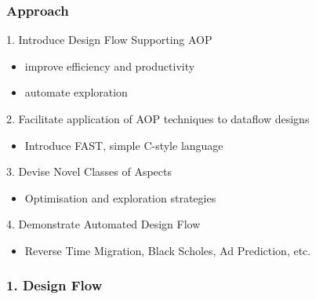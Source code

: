 \begin{frame}
  \frametitle{Approach}
  \begin{beamerboxesrounded}{1. Introduce Design Flow Supporting AOP}
    \begin{itemize}
      \item improve efficiency and productivity
      \item automate exploration
    \end{itemize}
  \end{beamerboxesrounded}
  \begin{beamerboxesrounded}{2. Facilitate application of AOP
      techniques to dataflow designs}
    \begin{itemize}
    \item Introduce FAST, simple C-style language
    \end{itemize}
  \end{beamerboxesrounded}

  \begin{beamerboxesrounded}{3. Devise Novel Classes of Aspects}
    \begin{itemize}
    \item Optimisation and exploration strategies
    \end{itemize}
  \end{beamerboxesrounded}

  \begin{beamerboxesrounded}{4. Demonstrate Automated Design Flow}
    \begin{itemize}
    \item Reverse Time Migration, Black Scholes, Ad Prediction, etc.
    \end{itemize}
  \end{beamerboxesrounded}
\end{frame}

\begin{frame}
  \frametitle{1. Design Flow}
  \vspace{-0.3cm}
  \begin{figure}
    \centering
    \def\svgwidth{0.88\textwidth}
    
  \end{figure}
\end{frame}